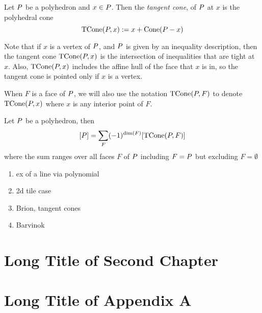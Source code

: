 \begin{definition} 
Let ${ P}$ be a polyhedron and $x \in { P}$. Then the \emph{tangent cone}, of ${ P}$ at $x$ is the polyhedral cone 
\[\operatorname{TCone}({ P}, x) := x + \operatorname{Cone}({ P} - x)\]  
\end{definition} 
 
Note that if $x$ is a vertex of ${ P}$, and ${ P}$ is given by an inequality description, then the tangent cone $\operatorname{TCone}({ P}, x)$ is the intersection of inequalities that are tight at $x$. Also, $\operatorname{TCone}({ P}, x)$ includes the affine hull of the face that $x$ is in, so the tangent cone is pointed only if $x$ is a vertex. 

When $F$ is a face of ${ P}$, we will also use the notation $\operatorname{TCone}({ P}, F)$ to denote $\operatorname{TCone}({ P}, x)$ where $x$ is any interior point of $F$.

\begin{theorem}
Let ${ P}$ be a polyhedron, then 
\[[{ P}] = \sum_{F} (-1)^{\dim(F)}[\operatorname{TCone}({ P}, F)] \]
where the sum ranges over all faces $F$ of ${ P}$ including $F = { P}$ but excluding $F = \emptyset$
\end{theorem} 

 
   \begin{enumerate}
   \item ex of a line via polynomial
   \item 2d tile case
   \item Brion, tangent cones
   \item Barvinok
   
   \end{enumerate}
   
   
   
   
   
   
   
   
   

   \chapter[%
      Short Title of 2nd Ch.
   ]{%
      Long Title of Second Chapter
   }%
   \label{ch:2ndChapterLabel}
   
   
   \appendix

   \chapter[%
      Short Title of Appendix A
   ]{%
      Long Title of Appendix A
   }%
   \label{ch:AppendixALabel}
   
       
   \backmatter
   
   
   
